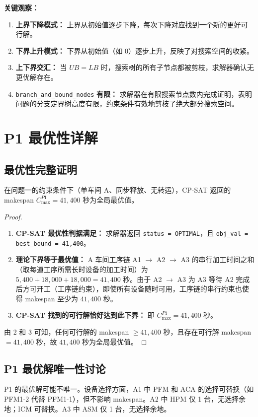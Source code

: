 \documentclass[UTF8,a4paper,12pt]{ctexart}
\begin{document}
\textbf{关键观察：}
\begin{enumerate}
  \item \textbf{上界下降模式：} 上界从初始值逐步下降，每次下降对应找到一个新的更好可行解。
  \item \textbf{下界上升模式：} 下界从初始值（如 0）逐步上升，反映了对搜索空间的收紧。
  \item \textbf{上下界交汇：} 当 $UB = LB$ 时，搜索树的所有子节点都被剪枝，求解器确认无更优解存在。
  \item \texttt{branch\_and\_bound\_nodes} \textbf{有限：} 求解器在有限搜索节点数内完成证明，表明问题的分支定界树高度有限，约束条件有效地剪枝了绝大部分搜索空间。
\end{enumerate}

\section{P1 最优性详解}
\subsection{最优性完整证明}
\begin{theorem}[P1 最优性]
在问题一的约束条件下（单车间 A、同步释放、无转运），CP-SAT 返回的 makespan $C_{\max}^{P1} = 41,400$ 秒为全局最优值。
\end{theorem}

\begin{proof}
\begin{enumerate}
  \item \textbf{CP-SAT 最优性判据满足：} 求解器返回 \texttt{status = OPTIMAL}，且 \texttt{obj\_val = best\_bound = 41,400}。
  \item \textbf{理论下界等于最优值：} A 车间工序链 A1 $\to$ A2 $\to$ A3 的串行加工时间之和（取每道工序所需长时设备的加工时间）为 $5,400 + 18,000 + 18,000 = 41,400$ 秒。由于 A2 $\to$ A3 为 A3 等待 A2 完成后方可开工（工序链约束），即使所有设备随时可用，工序链的串行约束也使得 makespan 至少为 $41,400$ 秒。
  \item \textbf{CP-SAT 找到的可行解恰好达到此下界：} 即 $C_{\max}^{P1} = 41,400$ 秒。
\end{enumerate}
由 2 和 3 可知，任何可行解的 makespan $\geq 41,400$ 秒，且存在可行解 makespan $= 41,400$ 秒，故 $41,400$ 秒为全局最优值。
\end{proof}

\subsection{P1 最优解唯一性讨论}
P1 的最优解可能不唯一。设备选择方面，A1 中 PFM 和 ACA 的选择可替换（如 PFM1-2 代替 PFM1-1），但不影响 makespan。A2 中 HPM 仅 1 台，无选择余地；ICM 可替换。A3 中 ASM 仅 1 台，无选择余地。
\end{document}
